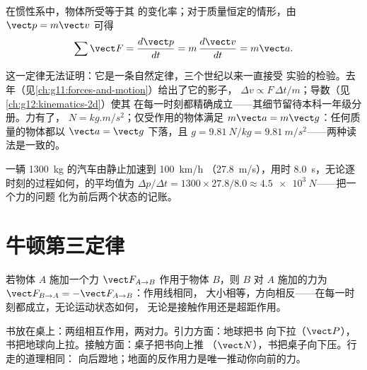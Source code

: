 \begin{theorem}[牛顿第二定律]\label{thm:g12:newtons-laws:second}
在惯性系中，物体所受等于其
的变化率；对于质量恒定的情形，由 $\vect p = m\vect v$ 可得
\[
\sum \vect F = \frac{d\vect p}{dt} = m\,\frac{d\vect v}{dt} = m \vect a .
\]
\end{theorem}
\admitted

\begin{remark}[自然定律及其单位]\label{rem:g12:newtons-laws:nature}
这一定律无法证明：它是一条自然定律，三个世纪以来一直接受
实验的检验。去年（见\cref{ch:g11:forces-and-motion}）给出了它的影子，
$\Delta v \propto F\,\Delta t/m$；导数（见\cref{ch:g12:kinematics-2d}）使其
在每一时刻都精确成立——其细节留待本科一年级分册。力有了，
$\unit{N} = \unit{kg.m/s^2}$；仅受作用的物体满足
$m\vect a = m\vect g$：任何质量的物体都以 $\vect a = \vect g$ 下落，且
$g = \qty{9.81}{N/kg} = \qty{9.81}{m/s^2}$——两种读法是一致的。
\end{remark}

\begin{example}\label{ex:g12:newtons-laws:average}
一辆 \qty{1300}{kg} 的汽车由静止加速到 \qty{100}{km/h}
（\qty{27.8}{m/s}），用时 \qty{8.0}{s}，无论逐时刻的过程如何，的平均值为
$\Delta p/\Delta t = 1300 \times 27.8/8.0 \approx \qty{4.5e3}{N}$——把一个力的问题
化为前后两个状态的记账。
\end{example}

\section{牛顿第三定律}

\begin{theorem}[牛顿第三定律]\label{thm:g12:newtons-laws:third}
若物体 $A$ 施加一个力 $\vect F_{A \to B}$ 作用于物体 $B$，则 $B$ 对
$A$ 施加的力为 $\vect F_{B \to A} = -\vect F_{A \to B}$：作用线相同，
大小相等，方向相反——在每一时刻都成立，无论运动状态如何，
无论是接触作用还是超距作用。
\end{theorem}
\admitted

\begin{example}[书、桌子与地球]\label{ex:g12:newtons-laws:book}
书放在桌上：两组相互作用，两对力。引力方面：地球把书
向下拉（$\vect P$），书把地球向上拉。接触方面：桌子把书向上推
（$\vect N$），书把桌子向下压。行走的道理相同：
向后蹬地；地面的反作用力是唯一推动你向前的力。
\end{example}

